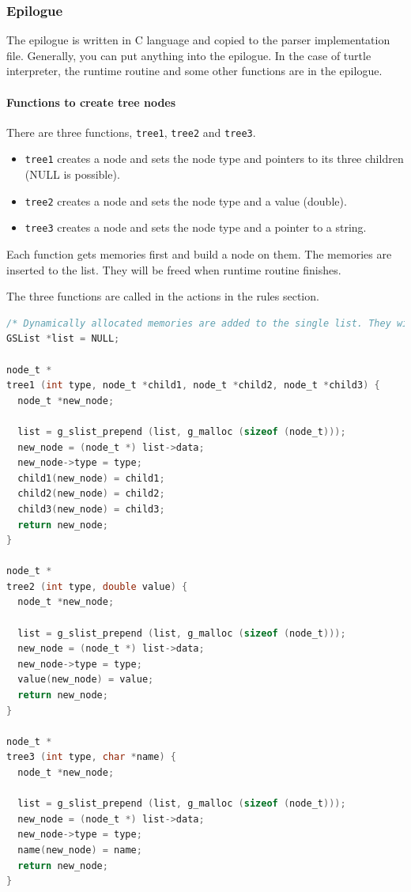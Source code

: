 \hypertarget{epilogue}{%
\subsubsection{Epilogue}\label{epilogue}}

The epilogue is written in C language and copied to the parser
implementation file. Generally, you can put anything into the epilogue.
In the case of turtle interpreter, the runtime routine and some other
functions are in the epilogue.

\hypertarget{functions-to-create-tree-nodes}{%
\paragraph{Functions to create tree
nodes}\label{functions-to-create-tree-nodes}}

There are three functions, \passthrough{\lstinline!tree1!},
\passthrough{\lstinline!tree2!} and \passthrough{\lstinline!tree3!}.

\begin{itemize}
\tightlist
\item
  \passthrough{\lstinline!tree1!} creates a node and sets the node type
  and pointers to its three children (NULL is possible).
\item
  \passthrough{\lstinline!tree2!} creates a node and sets the node type
  and a value (double).
\item
  \passthrough{\lstinline!tree3!} creates a node and sets the node type
  and a pointer to a string.
\end{itemize}

Each function gets memories first and build a node on them. The memories
are inserted to the list. They will be freed when runtime routine
finishes.

The three functions are called in the actions in the rules section.

\begin{lstlisting}[language=C]
/* Dynamically allocated memories are added to the single list. They will be freed in the finalize function. */
GSList *list = NULL;

node_t *
tree1 (int type, node_t *child1, node_t *child2, node_t *child3) {
  node_t *new_node;

  list = g_slist_prepend (list, g_malloc (sizeof (node_t)));
  new_node = (node_t *) list->data;
  new_node->type = type;
  child1(new_node) = child1;
  child2(new_node) = child2;
  child3(new_node) = child3;
  return new_node;
}

node_t *
tree2 (int type, double value) {
  node_t *new_node;

  list = g_slist_prepend (list, g_malloc (sizeof (node_t)));
  new_node = (node_t *) list->data;
  new_node->type = type;
  value(new_node) = value;
  return new_node;
}

node_t *
tree3 (int type, char *name) {
  node_t *new_node;

  list = g_slist_prepend (list, g_malloc (sizeof (node_t)));
  new_node = (node_t *) list->data;
  new_node->type = type;
  name(new_node) = name;
  return new_node;
}
\end{lstlisting}

